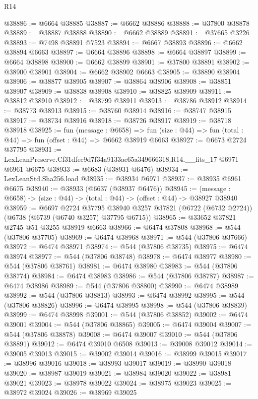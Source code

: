 \begin{lexlean}{R14}
\begin{coremodule}
@38886 := @6664 @38885
@38887 := @6662 @38886
@38888 := @37800 @38878
@38889 := @38887 @38888
@38890 := @6662 @38889
@38891 := @37665 @3226
@38893 := @7498 @38891 @7523
@38894 := @6667 @38893
@38896 := @6662 @38894 @6663
@38897 := @6664 @38896
@38898 := @6664 @38897
@38899 := @6664 @38898
@38900 := @6662 @38899
@38901 := @37800 @38891
@38902 := @38900 @38901
@38904 := @6662 @38902 @6663
@38905 := @38890 @38904
@38906 := @38877 @38905
@38907 := @38864 @38906
@38908 := @38851 @38907
@38909 := @38838 @38908
@38910 := @38825 @38909
@38911 := @38812 @38910
@38912 := @38799 @38911
@38913 := @38786 @38912
@38914 := @38773 @38913
@38915 := @38760 @38914
@38916 := @38747 @38915
@38917 := @38734 @38916
@38918 := @38726 @38917
@38919 := @38718 @38918
@38925 := fun (message : @6658) =>
  fun (size : @44) => fun (total : @44) => fun (offset : @44) => @6662 @38919 @6663
@38927 := @6673 @2724 @37795
@38931 := LexLeanPreserve.Cf31dfec9d7f34a9133ae65a349666318.R14.__fits_17 @6971 @6961 @6675
@38933 := @6683 (@38931 @6476)
@38934 := LexLeanStd.Sha256.load
@38935 := @38934 @6971
@38937 := @38935 @6961 @6675
@38940 := @38933 (@6637 (@38937 @6476))
@38945 := (message : @6658) -> (size : @44) -> (total : @44) -> (offset : @44) -> @38927 @38940
@38959 := @6697
    @2724
    @37795
    @38940
    @3257
    @37821
    (@6722 (@6732 @2724))
    (@6738 (@6739 (@6740 @3257) @37795 @6715))
@38965 := @33652 @37821 @2745 @51 @3255 @38919 @6663
@38966 := @6474 @37808
@38968 := @544 (@37806 @37705)
@38969 := @6474 @38968
@38971 := @544 (@37806 @37666)
@38972 := @6474 @38971
@38974 := @544 (@37806 @38735)
@38975 := @6474 @38974
@38977 := @544 (@37806 @38748)
@38978 := @6474 @38977
@38980 := @544 (@37806 @38761)
@38981 := @6474 @38980
@38983 := @544 (@37806 @38774)
@38984 := @6474 @38983
@38986 := @544 (@37806 @38787)
@38987 := @6474 @38986
@38989 := @544 (@37806 @38800)
@38990 := @6474 @38989
@38992 := @544 (@37806 @38813)
@38993 := @6474 @38992
@38995 := @544 (@37806 @38826)
@38996 := @6474 @38995
@38998 := @544 (@37806 @38839)
@38999 := @6474 @38998
@39001 := @544 (@37806 @38852)
@39002 := @6474 @39001
@39004 := @544 (@37806 @38865)
@39005 := @6474 @39004
@39007 := @544 (@37806 @38878)
@39008 := @6474 @39007
@39010 := @544 (@37806 @38891)
@39012 := @6474 @39010 @6508
@39013 := @39008 @39012
@39014 := @39005 @39013
@39015 := @39002 @39014
@39016 := @38999 @39015
@39017 := @38996 @39016
@39018 := @38993 @39017
@39019 := @38990 @39018
@39020 := @38987 @39019
@39021 := @38984 @39020
@39022 := @38981 @39021
@39023 := @38978 @39022
@39024 := @38975 @39023
@39025 := @38972 @39024
@39026 := @38969 @39025

\end{coremodule}
\end{lexlean}
